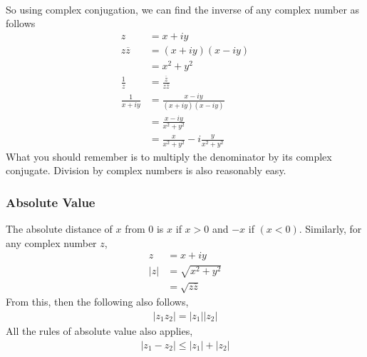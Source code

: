 \documentclass{article}
\begin{document}
\noindent \\ So using complex conjugation, we can find the inverse of any
complex number as follows
\begin{align*}
	z              & = x+iy                                           \\
	z \overline{z} & = (x+iy)(x-iy)                                   \\
	               & = x^{2}+y^{2}                                    \\
	\frac{1 }{z }  & = \frac{\overline{z}}{z\overline{z}}             \\
	\frac{1}{x+iy} & = \frac{x-iy}{(x+iy)(x-iy)}                      \\
	               & = \frac{x-iy}{x^{2}+y^{2}}                       \\
	               & = \frac{x}{x^{2}+y^{2}} - i\frac{y}{x^{2}+y^{2}}
\end{align*}
What you should remember is to multiply the denominator by its complex conjugate. Division by complex
numbers is also reasonably easy.

\subsubsection{Absolute Value}
The absolute distance of $x$ from 0 is $x$ if $x>0$ and $-x$ if $(x<0)$. Similarly, for any complex
number $z$,
\begin{align*}
	z   & = x+iy                 \\
	|z| & = \sqrt{x^{2}+y^{2}}   \\
	    & = \sqrt{z\overline{z}}
\end{align*}
From this, then the following also follows,
\begin{gather*}
	|z_{1}z_{2}| = |z_{1}||z_{2}|
\end{gather*}
All the rules of absolute value also applies,
\begin{gather*}
	|z_{1}-z_{2}| \leq |z_{1}| + |z_{2}|
\end{gather*}
\end{document}
